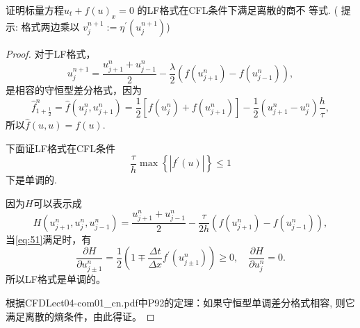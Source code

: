 \documentclass[12pt]{article}
\begin{document}
证明标量方程$u_{t} +f(u)_{x}=0$ 的LF格式在CFL条件下满足离散的商不 等式. ( 提示: 格式两边乘以 $v_{j}^{n+1}:=\eta^{\prime}\left(u_{j}^{n+1}\right) $)

\begin{proof}

	对于LF格式，
	\begin{equation}
		u_{j}^{n+1}=\frac{u_{j+1}^{n}+u_{j-1}^{n}}{2}-\frac{\lambda}{2}\left(f\left(u_{j+1}^{n}\right)-f\left(u_{j-1}^{n}\right)\right),
	\end{equation}
是相容的守恒型差分格式，因为
\begin{equation}
	\hat{f}^n_{1+\frac{1}{2}} = \hat{f}\left(u^n_j,u^n_{j+1}\right)=\frac{1}{2}\left[f\left(u^n_j\right)+f\left(u^n_{j+1}\right)\right]-\frac{1}{2}\left(u^n_{j+1}-u^n_j\right)\frac{h}{\tau},
\end{equation}
所以$\hat{f}(u,u)=f(u)$.

下面证LF格式在CFL条件
\begin{equation}
	\frac{\tau}{h} \max \left\{\left|f^{\prime}(u)\right|\right\} \leqslant 1
	\label{eq:51}
\end{equation}
下是单调的.

因为$H$可以表示成
\begin{equation}
	H\left(u_{j+1}^{n}, u_{j}^{n}, u_{j-1}^{n}\right)=\frac{u_{j+1}^{n}+u_{j-1}^{n}}{2}-\frac{\tau}{2 h}\left(f\left(u_{j+1}^{n}\right)-f\left(u_{j-1}^{n}\right)\right),
\end{equation}
当\cref{eq:51}满足时，有
\begin{equation}
	\frac{\partial H}{\partial u_{j \pm 1}^{n}}=\frac{1}{2}\left(1 \mp \frac{\Delta t}{\Delta x} f^{\prime}\left(u_{j \pm 1}^{n}\right)\right) \geqslant 0,\quad \frac{\partial H}{\partial u_{j}^{n}}=0.
\end{equation}
所以LF格式是单调的。

根据CFDLect04-com01_cn.pdf中P92的定理：如果守恒型单调差分格式相容, 则它满足离散的熵条件，由此得证。



\end{proof}





\end{document}
